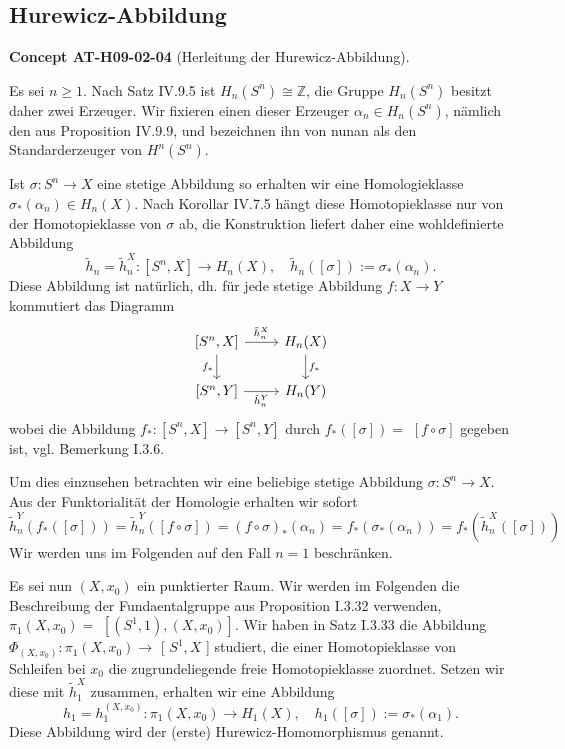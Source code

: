 \documentclass[10pt, letterpaper]{article}
\newcommand{\CustomHeading}[3]{%
  \par\medskip\noindent%
  \textbf{#1 #2} \textnormal{(#3)}.\enskip%
}
\newenvironment{CONC}[2]{\CustomHeading{Concept}{#1}{#2}}{}
\begin{document}
\subsection{Hurewicz-Abbildung}

\begin{CONC}{AT-H09-02-04}{Herleitung der Hurewicz-Abbildung}
Es sei $n \geq 1$. Nach Satz IV.9.5 ist $H_n\left(S^n\right) \cong \mathbb{Z}$, die Gruppe $H_n\left(S^n\right)$ besitzt daher zwei Erzeuger. Wir fixieren einen dieser Erzeuger $\alpha_n \in H_n\left(S^n\right)$, nämlich den aus Proposition IV.9.9, und bezeichnen ihn von nunan als den Standarderzeuger von $H^n\left(S^n\right)$.

Ist $\sigma: S^n \rightarrow X$ eine stetige Abbildung so erhalten wir eine Homologieklasse $\sigma_*\left(\alpha_n\right) \in H_n(X)$. Nach Korollar IV.7.5 hängt diese Homotopieklasse nur von der Homotopieklasse von $\sigma$ ab, die Konstruktion liefert daher eine wohldefinierte Abbildung
$$
\tilde{h}_n=\tilde{h}_n^X:\left[S^n, X\right] \rightarrow H_n(X), \quad \tilde{h}_n([\sigma]):=\sigma_*\left(\alpha_n\right) .
$$
Diese Abbildung ist natürlich, dh. für jede stetige Abbildung $f: X \rightarrow Y$ kommutiert das Diagramm
\[
\begin{tikzcd}
{[S^n, X]} \arrow[r, "\tilde{h}_n^X"] \arrow[d, "f_*"'] & H_n(X) \arrow[d, "f_*"] \\
{[S^n, Y]} \arrow[r, "\tilde{h}_n^Y"'] & H_n(Y)
\end{tikzcd}
\]
wobei die Abbildung $f_*:\left[S^n, X\right] \rightarrow\left[S^n, Y\right]$ durch $f_*([\sigma])=$ $[f \circ \sigma]$ gegeben ist, vgl. Bemerkung I.3.6. 

Um dies einzusehen betrachten wir eine beliebige stetige Abbildung $\sigma: S^n \rightarrow X$. Aus der Funktorialität der Homologie erhalten wir sofort 
$$\tilde{h}_n^Y\left(f_*([\sigma])\right)=\tilde{h}_n^Y([f \circ \sigma])=(f \circ \sigma)_*\left(\alpha_n\right)=f_*\left(\sigma_*\left(\alpha_n\right)\right)=f_*\left(\tilde{h}_n^X([\sigma])\right)$$ 
Wir werden uns im Folgenden auf den Fall $n=1$ beschränken.

Es sei nun $(X, x_0)$ ein punktierter Raum. Wir werden im Folgenden die Beschreibung der Fundaentalgruppe aus Proposition I.3.32 verwenden, $\pi_1\left(X, x_0\right)=$ $\left[\left(S^1, 1\right),\left(X, x_0\right)\right]$. Wir haben in Satz I.3.33 die Abbildung $\Phi_{\left(X, x_0\right)}: \pi_1\left(X, x_0\right) \rightarrow$ [ $S^1, X$ ] studiert, die einer Homotopieklasse von Schleifen bei $x_0$ die zugrundeliegende freie Homotopieklasse zuordnet. Setzen wir diese mit $\tilde{h}_1^X$ zusammen, erhalten wir eine Abbildung
$$
h_1=h_1^{\left(X, x_0\right)}: \pi_1\left(X, x_0\right) \rightarrow H_1(X), \quad h_1([\sigma]):=\sigma_*\left(\alpha_1\right) .
$$
Diese Abbildung wird der (erste) Hurewicz-Homomorphismus genannt.
\end{CONC}
\end{document}
